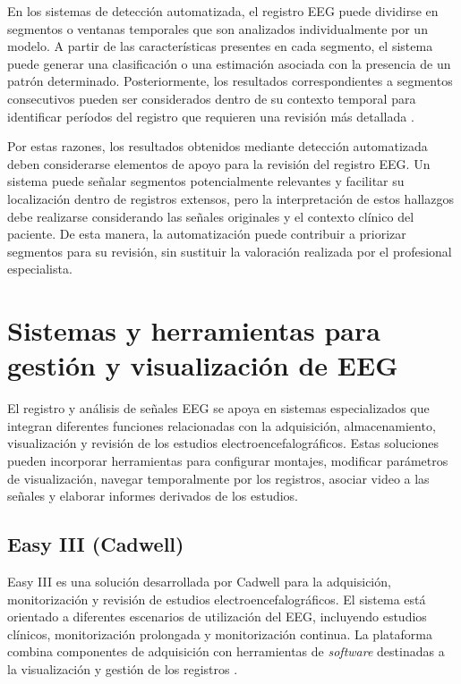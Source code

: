 En los sistemas de detección automatizada, el registro EEG puede dividirse
en segmentos o ventanas temporales que son analizados individualmente por un
modelo. A partir de las características presentes en cada segmento, el sistema
puede generar una clasificación o una estimación asociada con la presencia de
un patrón determinado. Posteriormente, los resultados correspondientes a
segmentos consecutivos pueden ser considerados dentro de su contexto temporal
para identificar períodos del registro que requieren una revisión más
detallada \citep{Rasheed2021MachineLearning}.

Por estas razones, los resultados obtenidos mediante detección
automatizada deben considerarse elementos de apoyo para la
revisión del registro EEG. Un sistema puede señalar segmentos
potencialmente relevantes y facilitar su localización dentro
de registros extensos, pero la interpretación de estos hallazgos
debe realizarse considerando las señales originales y el
contexto clínico del paciente. De esta manera, la automatización
puede contribuir a priorizar segmentos para su revisión, sin
sustituir la valoración realizada por el profesional especialista.

\section{Sistemas y herramientas para gestión y visualización de EEG}
\label{sec:sistemas-herramientas-eeg}

El registro y análisis de señales EEG se apoya en sistemas especializados que
integran diferentes funciones relacionadas con la adquisición, almacenamiento,
visualización y revisión de los estudios electroencefalográficos. Estas
soluciones pueden incorporar herramientas para configurar montajes, modificar
parámetros de visualización, navegar temporalmente por los registros, asociar
video a las señales y elaborar informes derivados de los estudios.

\subsection{Easy III (Cadwell)}
\label{subsec:easy-cadwell-iii}

Easy III es una solución desarrollada por Cadwell para la adquisición,
monitorización y revisión de estudios electroencefalográficos. El sistema está
orientado a diferentes escenarios de utilización del EEG, incluyendo estudios
clínicos, monitorización prolongada y monitorización continua. La plataforma
combina componentes de adquisición con herramientas de \textit{software} destinadas a la visualización y gestión de los registros \citep{CadwellEasyIII}.

